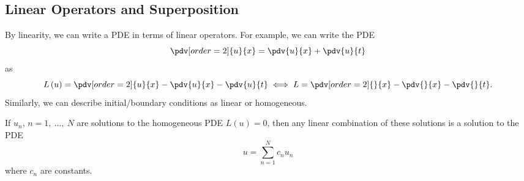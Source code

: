 \documentclass{article}
\begin{document}
\subsection{Linear Operators and Superposition}
By linearity, we can write a PDE in terms of linear operators. For
example, we can write the PDE
\begin{equation*}
    \pdv[order=2]{u}{x} = \pdv{u}{x} + \pdv{u}{t}
\end{equation*}
as
\begin{equation*}
    L\left( u \right) = \pdv[order=2]{u}{x} - \pdv{u}{x} - \pdv{u}{t} \iff L = \pdv[order=2]{}{x} - \pdv{}{x} - \pdv{}{t}.
\end{equation*}
Similarly, we can describe initial/boundary conditions as linear or homogeneous.
\begin{theorem}[Superposition]
    If \(u_n\), \(n = 1,\: \dots,\: N\) are solutions to the homogeneous PDE \(L\left( u \right) = 0\), then any linear combination
    of these solutions is a solution to the PDE
    \begin{equation*}
        u = \sum_{n = 1}^N c_n u_n
    \end{equation*}
    where \(c_n\) are constants.
\end{theorem}
\end{document}
